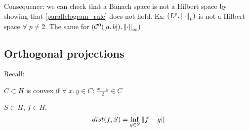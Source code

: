 Consequence: we can check that a Banach space is not a Hilbert space by showing that \eqref{parallelogram_rule} does not hold.
Ex: \((L^p, \norm{\cdot}_p)\) is not a Hilbert space \(\forall\; p \neq 2\). The same for \((\mathcal{C}^0([a, b]), \norm{\cdot}_\infty )\)

\subsection{Orthogonal projections}

Recall:
\begin{definition}
    \(C \subset H \) is convex if \(\forall\; x, y \in C: \, \frac{x+y}{2} \in C\)
\end{definition}
\begin{definition}
    \(S \subset H\), \(f \in H\). \[ dist (f, S) = \inf_{g \in S} \norm{f-g}\]
\end{definition}


